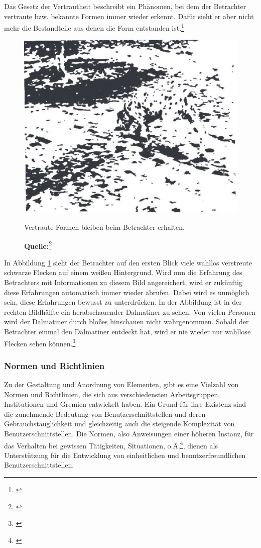 Das Gesetz der Vertrautheit beschreibt ein Phänomen, bei dem der Betrachter vertraute bzw. bekannte Formen immer wieder erkennt. Dafür sieht er aber nicht mehr die Bestandteile aus denen die Form entstanden ist.\footnote{\cite[vgl.][63f]{Dahm2006}}
\begin{figure}[H]
  \centering
  \includegraphics[scale=0.7]{img/gesetz_der_Vertrautheit.PNG}
  \caption{Vertraute Formen bleiben beim Betrachter erhalten.}
  \caption*{\textbf{Quelle:}\footnote{\cite{Dahm2006}}}
  \label{fig:vertrautheit}
\end{figure}
In Abbildung \ref{fig:vertrautheit} sieht der Betrachter auf den ersten Blick viele wahllos verstreute schwarze Flecken auf einem weißen Hintergrund. Wird nun die Erfahrung des Betrachters mit Informationen zu diesem Bild angereichert, wird er zukünftig diese Erfahrungen automatisch immer wieder abrufen. Dabei wird es unmöglich sein, diese Erfahrungen bewusst zu unterdrücken. In der Abbildung ist in der rechten Bildhälfte ein herabschauender Dalmatiner zu sehen. Von vielen Personen wird der Dalmatiner durch bloßes hinschauen nicht wahrgenommen. Sobald der Betrachter einmal den Dalmatiner entdeckt hat, wird er nie wieder nur wahllose Flecken sehen können.\footnote{\cite[vgl.][63f]{Dahm2006}}


\subsubsection{Normen und Richtlinien}
\label{sec:normenUndRichtlinien}
Zu der Gestaltung und Anordnung von Elementen, gibt es eine Vielzahl von Normen und Richtlinien, die sich aus verschiedensten Arbeitsgruppen, Institutionen und Gremien entwickelt haben. Ein Grund für ihre Existenz sind die zunehmende Bedeutung von Benutzerschnittstellen und deren Gebrauchstauglichkeit und gleichzeitig auch die steigende Komplexität von Benutzerschnittstellen. Die Normen, also Anweisungen einer höheren Instanz, für das Verhalten bei gewissen Tätigkeiten, Situationen, o.Ä.\footnote{\cite[vgl.][]{duden}}, dienen als Unterstützung für die Entwicklung von einheitlichen und benutzerfreundlichen Benutzerschnittstellen. 

